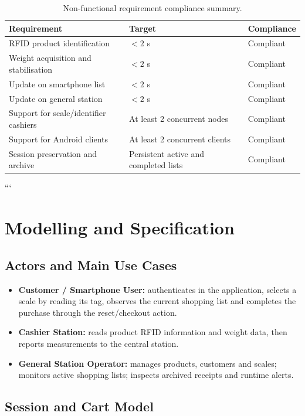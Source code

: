 \documentclass[11pt,a4paper]{article}
\begin{document}
\begin{table}[H]
\centering
\caption{Non-functional requirement compliance summary.}
\label{tab:nfr-summary}
\begin{tabularx}{\textwidth}{@{}p{}p{}Y@{}}
\toprule
\textbf{Requirement} & \textbf{Target} & \textbf{Compliance} \\
\midrule
RFID product identification & $< 2$ s & Compliant \\
Weight acquisition and stabilisation & $< 2$ s & Compliant \\
Update on smartphone list & $< 2$ s & Compliant \\
Update on general station & $< 2$ s & Compliant \\
Support for scale/identifier cashiers & At least 2 concurrent nodes & Compliant \\
Support for Android clients & At least 2 concurrent clients & Compliant \\
Session preservation and archive & Persistent active and completed lists & Compliant \\
\bottomrule
\end{tabularx}
\end{table}
```

\section{Modelling and Specification}

\subsection{Actors and Main Use Cases}

\begin{itemize}
    \item \textbf{Customer / Smartphone User:} authenticates in the application, selects a scale by reading its tag, observes the current shopping list and completes the purchase through the reset/checkout action.
    \item \textbf{Cashier Station:} reads product RFID information and weight data, then reports measurements to the central station.
    \item \textbf{General Station Operator:} manages products, customers and scales; monitors active shopping lists; inspects archived receipts and runtime alerts.
\end{itemize}

\subsection{Session and Cart Model}
\end{document}

